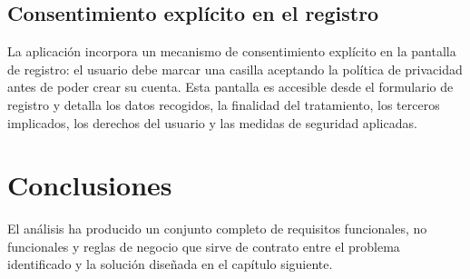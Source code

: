 \subsection{Consentimiento explícito en el registro}

La aplicación incorpora un mecanismo de consentimiento explícito en la pantalla de registro: el usuario debe marcar una casilla aceptando la política de privacidad antes de poder crear su cuenta. Esta pantalla es accesible desde el formulario de registro y detalla los datos recogidos, la finalidad del tratamiento, los terceros implicados, los derechos del usuario y las medidas de seguridad aplicadas.

\section{Conclusiones}

El análisis ha producido un conjunto completo de requisitos funcionales, no funcionales y reglas de negocio que sirve de contrato entre el problema identificado y la solución diseñada en el capítulo siguiente.
